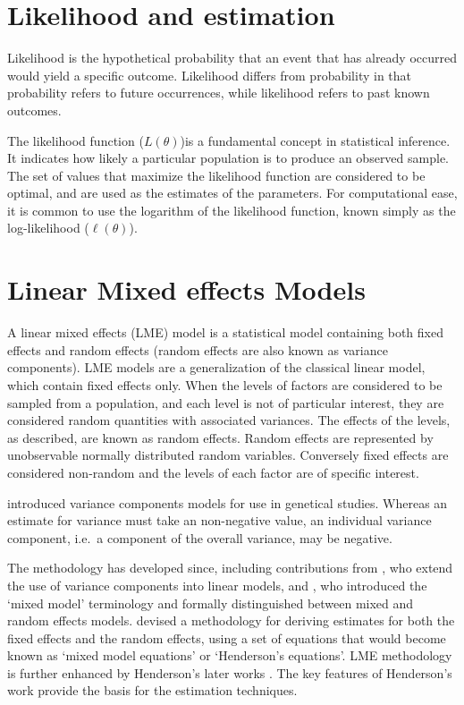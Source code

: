 \documentclass[12pt, a4paper]{report}
\theoremstyle{plain}
\theoremstyle{definition}
\theoremstyle{remark}
\begin{document}
\section{Likelihood and estimation}

 Likelihood is the hypothetical probability that an event that has already occurred would yield a specific outcome. Likelihood differs from probability in that probability refers to future occurrences, while likelihood refers to past known outcomes.

 The likelihood function ($L(\theta)$)is a fundamental concept in statistical inference. It indicates how likely a particular population is to produce an observed sample. The set of values that maximize the likelihood function are considered to be optimal, and are used as the estimates of the parameters. For computational ease, it is common to use the logarithm of the likelihood function, known simply as the log-likelihood ($\ell(\theta)$).


\newpage

	\section{Linear Mixed effects Models}
	A linear mixed effects (LME) model is a statistical model containing both fixed effects and random effects (random effects are also known as variance components). LME models are a generalization of the classical linear model, which contain fixed effects only. When the levels of factors are considered to be sampled from a population,
	and each level is not of particular interest, they are considered random quantities with associated variances.
	The effects of the levels, as described, are known as random effects. Random effects are represented by unobservable
	normally distributed random variables. Conversely fixed effects are considered non-random and the
	levels of each factor are of specific interest.
	
	\citet{Fisher4} introduced variance components models for use in genetical studies. Whereas an estimate for variance must take an non-negative value, an individual variance component, i.e.\ a component of the overall variance, may be negative.
	
	The methodology has developed since, including contributions from
	\citet{tippett}, who extend the use of variance components into linear models, and \citet{eisenhart}, who introduced the `mixed model' terminology and formally distinguished between mixed and random effects models. \citet{Henderson:1950} devised a methodology for deriving estimates for both the fixed effects and the random effects, using a set of equations that would become known as `mixed model equations' or `Henderson's equations'.
	LME methodology is further enhanced by Henderson's later works \citep{Henderson53, Henderson59,Henderson63,Henderson73,Henderson84a}. The key features of Henderson's work provide the basis for the estimation techniques.
	
\end{document}
